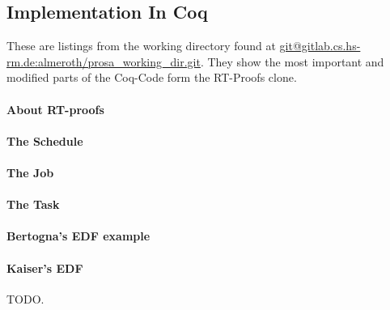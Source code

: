 
\subsection{Implementation In Coq}

These are listings from the working directory found at \url{git@gitlab.cs.hs-rm.de:almeroth/prosa_working_dir.git}.
They show the most important and modified parts of the Coq-Code form the RT-Proofs clone.

\paragraph{About RT-proofs}





\paragraph{The Schedule}

\paragraph{The Job}

\paragraph{The Task}

\paragraph{Bertogna's EDF example}

\paragraph{Kaiser's EDF}
TODO.
